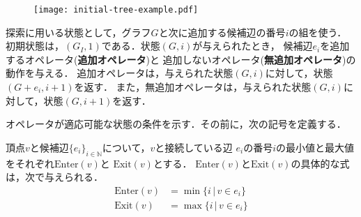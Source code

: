 \begin{figure}
  \centering
  \begin{minipage}{.45\columnwidth}
    \texttt{[image: initial-tree-example.pdf]}
    \label{fig:initial-tree-example}
  \end{minipage}
  \hfill
  \begin{minipage}{.45\columnwidth}
    \def\svgwidth{\textwidth}
    
    \label{fig:feasible-edges-example}
  \end{minipage}
\end{figure}

探索に用いる状態として，グラフ$G$と次に追加する候補辺の番号$i$の組を使う．
初期状態は，$(G_I,1)$である．状態$(G,i)$が与えられたとき，
候補辺$e_i$を追加するオペレータ(\textbf{追加オペレータ})と
追加しないオペレータ(\textbf{無追加オペレータ})の動作を与える．
追加オペレータは，与えられた状態$(G,i)$に対して，状態$(G+e_i,i+1)$を返す．
また，無追加オペレータは，与えられた状態$(G,i)$に対して，状態$(G,i+1)$を返す．

オペレータが適応可能な状態の条件を示す．その前に，次の記号を定義する．
\begin{definition}\rm
  頂点$v$と候補辺$\{e_i\}_{i\in\mathbb{N}}$について，$v$と接続している辺
  $e_i$の番号$i$の最小値と最大値をそれぞれ$\text{Enter}(v)$と
  $\text{Exit}(v)$とする．
  $\text{Enter}(v)$と$\text{Exit}(v)$の具体的な式は，次で与えられる．
  \begin{equation}
    \label{eq:frontier}
    \begin{aligned}
    \text{Enter}(v) &= \min\{i\,|\,v\in e_i\} \\
    \text{Exit}(v) &= \max\{i\,|\,v\in e_i\}
    \end{aligned}
  \end{equation}
\end{definition}

